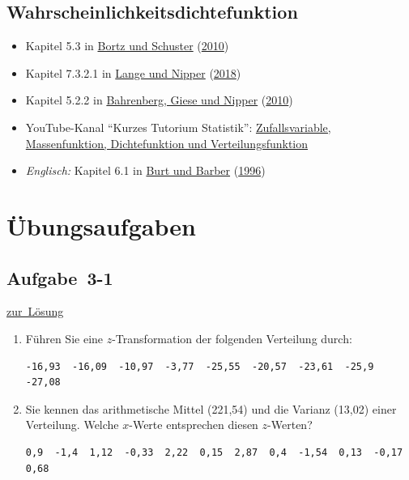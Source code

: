 \documentclass[
  11pt,
  ngerman,
  a4paper,
]{report}
\providecommand{\tightlist}{%
  \setlength{\itemsep}{0pt}\setlength{\parskip}{0pt}}
\begin{document}
\hypertarget{wahrscheinlichkeitsdichtefunktion}{%
\subsection{Wahrscheinlichkeitsdichtefunktion}\label{wahrscheinlichkeitsdichtefunktion}}

\begin{itemize}
\tightlist
\item
  Kapitel 5.3 in \protect\hyperlink{ref-bortz}{Bortz und Schuster} (\protect\hyperlink{ref-bortz}{2010})
\item
  Kapitel 7.3.2.1 in \protect\hyperlink{ref-delange}{Lange und Nipper} (\protect\hyperlink{ref-delange}{2018})
\item
  Kapitel 5.2.2 in \protect\hyperlink{ref-bahrenberg}{Bahrenberg, Giese und Nipper} (\protect\hyperlink{ref-bahrenberg}{2010})
\item
  YouTube-Kanal \enquote{Kurzes Tutorium Statistik}: \href{https://www.youtube.com/watch?v=DoHTsDrzAQk}{Zufallsvariable, Massenfunktion, Dichtefunktion und Verteilungsfunktion}
\item
  \emph{Englisch:} Kapitel 6.1 in \protect\hyperlink{ref-burt}{Burt und Barber} (\protect\hyperlink{ref-burt}{1996})
\end{itemize}

\hypertarget{uxfcbungsaufgaben-2}{%
\section*{Übungsaufgaben}\label{uxfcbungsaufgaben-2}}

\hypertarget{aufgabe-3-1}{%
\subsection{Aufgabe~3-1}\label{aufgabe-3-1}}

\protect\hyperlink{loesung-3-1}{zur~Lösung}

\begin{enumerate}
\def\labelenumi{\alph{enumi})}
\item
  Führen Sie eine \(z\)-Transformation der folgenden Verteilung durch:

\begin{verbatim}
-16,93  -16,09  -10,97  -3,77  -25,55  -20,57  -23,61  -25,9  -27,08
\end{verbatim}
\item
  Sie kennen das arithmetische Mittel (221,54) und die Varianz (13,02) einer Verteilung. Welche \(x\)-Werte entsprechen diesen \(z\)-Werten?

\begin{verbatim}
0,9  -1,4  1,12  -0,33  2,22  0,15  2,87  0,4  -1,54  0,13  -0,17  0,68
\end{verbatim}
\end{enumerate}
\end{document}
